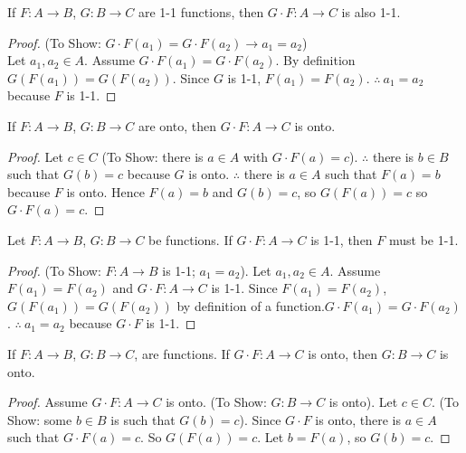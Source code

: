 \begin{proposition}
If $F:A\to B$, $G: B \to C$ are 1-1 functions, then $G\cdot F: A \to C$ is also 1-1.
\end{proposition}
\begin{proof}
(To Show: $G\cdot F(a_1) = G \cdot F(a_2) \to a_1=a_2$)\\
Let $a_1,a_2\in A$. Assume $G\cdot F (a_1) = G\cdot F(a_2)$. By definition $G(F(a_1))=G(F(a_2))$. Since $G$ is 1-1, $F(a_1)=F(a_2)$. $\therefore\ a_1=a_2$ because $F$ is 1-1.
\end{proof}
\begin{proposition}
If $F:A\to B$, $G:B\to C$ are onto, then $G\cdot F:A \to C$ is onto.
\end{proposition}
\begin{proof}
Let $c\in C$ (To Show: there is $a\in A$ with $G\cdot F(a)=c$). $\therefore$ there is $b\in B$ such that $G(b)=c$ because $G$ is onto. $\therefore$ there is $a\in A$ such that $F(a)=b$ because $F$ is onto. Hence $F(a)=b$ and $G(b)=c$, so $G(F(a))=c$ so $G\cdot F(a)=c$.
\end{proof}
\begin{proposition}
Let $F:A\to B$, $G:B\to C$ be functions. If $G\cdot F:A \to C$ is 1-1, then $F$ must be 1-1.
\end{proposition}
\begin{proof}
(To Show: $F:A \to B$ is 1-1; $a_1=a_2$). Let $a_1,a_2\in A$. Assume $F(a_1)=F(a_2)$ and $G\cdot F:A\to C$ is 1-1. Since $F(a_1)=F(a_2)$, $G(F(a_1))=G(F(a_2))$ by definition of a function.$G\cdot F(a_1) = G \cdot F (a_2)$. $\therefore\ a_1=a_2$ because $G\cdot F$ is 1-1.
\end{proof}
\begin{proposition}
If $F:A \to B$, $G: B \to C$, are functions. If $G\cdot F: A \to C$ is onto, then $G:B \to C$ is onto.
\end{proposition}
\begin{proof}
Assume $G\cdot F: A \to C$ is onto. (To Show: $G:B\to C$ is onto). Let $c\in C$. (To Show: some $b\in B$ is such that $G(b)=c$). Since $G\cdot F$ is onto, there is $a\in A$ such that $G \cdot F(a)=c$. So $G(F(a))=c$. Let $b=F(a)$, so $G(b)=c$.
\end{proof}

